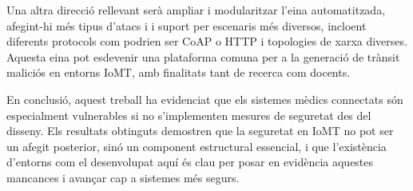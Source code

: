 Una altra direcció rellevant serà ampliar i modularitzar l’eina automatitzada, afegint-hi més tipus d’atacs i i suport per escenaris més diversos, incloent diferents protocols com podrien ser CoAP o HTTP i topologies de xarxa diverses. Aquesta eina pot esdevenir una plataforma comuna per a la generació de trànsit maliciós en entorns IoMT, amb finalitats tant de recerca com docents.

En conclusió, aquest treball ha evidenciat que els sistemes mèdics connectats són especialment vulnerables si no s’implementen mesures de seguretat des del disseny. Els resultats obtinguts demostren que la seguretat en IoMT no pot ser un afegit posterior, sinó un component estructural essencial, i que l’existència d’entorns com el desenvolupat aquí és clau per posar en evidència aquestes mancances i avançar cap a sistemes més segurs.